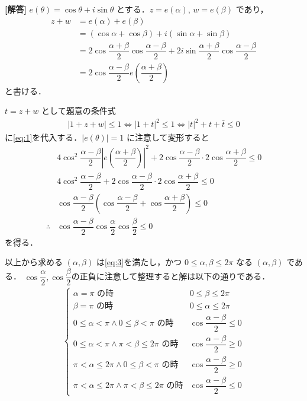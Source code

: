 \documentclass[../../main.tex]{subfiles}
\begin{document}
\begin{oframed}
  
\end{oframed}

{\bf [解答]}
$e(\theta) = \cos\theta + i\sin\theta$ とする．$z = e(\alpha)$, $w = e(\beta)$ であり，
\begin{align}
  z+w
  &= e(\alpha) + e(\beta) \\
  &= (\cos\alpha + \cos\beta) + i(\sin\alpha + \sin\beta) \\
  &= 2 \cos\dfrac{\alpha+\beta}{2} \cos\dfrac{\alpha-\beta}{2} + 2 i \sin\dfrac{\alpha+\beta}{2} \cos\dfrac{\alpha-\beta}{2} \\
  &= 2 \cos\dfrac{\alpha-\beta}{2} e\left(\dfrac{\alpha+\beta}{2}\right) \label{eq:1}
\end{align}
と書ける．

$t = z+w$ として題意の条件式
\begin{align}
  |1 + z + w| \le 1 \iff |1 + t|^2 \le 1 \iff |t|^2 + t + \bar{t} \le 0 \label{eq:2}
\end{align}
に\cref{eq:1}を代入する．$|e(\theta)| = 1$ に注意して変形すると
\begin{align}
  & 4 \cos^2\dfrac{\alpha-\beta}{2}\left|e\left(\dfrac{\alpha+\beta}{2}\right)\right|^2 + 2 \cos\dfrac{\alpha-\beta}{2} \cdot 2 \cos\dfrac{\alpha+\beta}{2} \le 0 \\
  & 4 \cos^2\dfrac{\alpha-\beta}{2} + 2 \cos\dfrac{\alpha-\beta}{2} \cdot 2 \cos\dfrac{\alpha+\beta}{2} \le 0 \\
  & \cos\dfrac{\alpha-\beta}{2} \left(\cos\dfrac{\alpha-\beta}{2} + \cos\dfrac{\alpha+\beta}{2}\right) \le 0 \\
  \therefore
  & \cos\dfrac{\alpha-\beta}{2} \cos\dfrac{\alpha}{2} \cos\dfrac{\beta}{2} \le 0 \label{eq:3}
\end{align}
を得る．

以上から求める $(\alpha, \beta)$ は\cref{eq:3}を満たし，かつ $0 \le \alpha, \beta \le 2\pi$ なる $(\alpha, \beta)$ である．
$\cos\dfrac{\alpha}{2}, \cos\dfrac{\beta}{2}$の正負に注意して整理すると解は以下の通りである．
\begin{align}
  \begin{cases}
    \alpha = \pi \text{ の時} & 0 \le \beta \le 2\pi \\
    \beta = \pi \text{ の時} & 0 \le \alpha \le 2\pi \\
    0 \le \alpha < \pi \land 0 \le \beta < \pi \text{ の時}       & \cos\dfrac{\alpha-\beta}{2} \le 0 \\
    0 \le \alpha < \pi \land \pi < \beta \le 2\pi \text{ の時}    & \cos\dfrac{\alpha-\beta}{2} \ge 0 \\
    \pi < \alpha \le 2\pi \land 0 \le \beta < \pi \text{ の時}    & \cos\dfrac{\alpha-\beta}{2} \ge 0 \\
    \pi < \alpha \le 2\pi \land \pi < \beta \le 2\pi \text{ の時} & \cos\dfrac{\alpha-\beta}{2} \le 0
  \end{cases}
\end{align}
\end{document}
